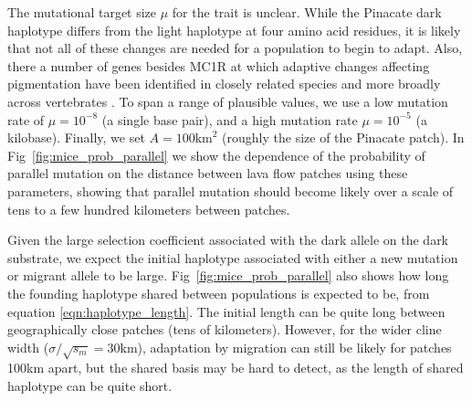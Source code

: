 \documentclass[10pt,letterpaper]{article}
\newcommand{\citep}[1]{\cite{#1}}
\begin{document}
The mutational target size $\mu$ for the trait is unclear. 
While the Pinacate dark haplotype differs from the light haplotype at four amino acid residues,
it is likely that not all of these changes are needed for a population to begin to adapt. 
Also, there a number of genes besides MC1R at which adaptive changes affecting pigmentation 
have been identified in closely related species and more broadly across vertebrates \citep{Hoekstra:06}.
To span a range of plausible values, we use a low mutation rate of $\mu= 10^{-8}$
(a single base pair),
and a high mutation rate $\mu= 10^{-5}$
(a kilobase).
Finally, we set $A=100\text{km}^2$ (roughly the size of the Pinacate
patch). In
Fig~\ref{fig:mice_prob_parallel} we show the dependence of the probability
of parallel mutation on the distance between lava flow patches using these parameters, 
showing that parallel mutation should become
likely over a scale of tens to a few hundred kilometers between patches. 

Given the large selection coefficient associated with the dark allele
on the dark substrate, we expect the initial haplotype associated with
either a new mutation or migrant allele to be large. 
Fig~\ref{fig:mice_prob_parallel} also shows how long the founding haplotype 
shared between populations is expected to be,
from equation \eqref{eqn:haplotype_length}.
The initial length can be quite long between geographically close patches (tens of kilometers). 
However, for the wider cline width ($\sigma/\sqrt{s_m} = 30$km), 
adaptation by migration can still be likely for patches 100km apart, 
but the shared basis may be hard to detect, as the length of shared haplotype can be quite short. 

\end{document}
